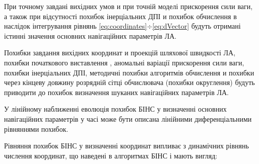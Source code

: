 При точному завдані вихідних умов и при точній  моделі прискорення сили ваги, а також 
при відсутності похибок інерціальних ДПІ и похибок обчислення в наслідок інтегрування 
рівнянь \eqref{eq:coordinates}$\div $\eqref{eq:dVector}  будуть отримані істинні 
значення основних навігаційних параметрів ЛА.

Похибки завдання вихідних координат и проекцій шляхової швидкості ЛА, похибки  початкового 
виставлення , аномальні варіації прискорення сили ваги, похибки інерціальних ДПІ, 
методичні похибки алгоритмів обчислення и похибки через  кінцеву довжину розрядній 
сітці обчислювача (похибки округлення) будуть приводити до похибок визначення шуканих 
навігаційних параметрів ЛА.

У лінійному наближенні еволюція похибок БІНС у визначенні основних навігаційних параметрів 
у часі може бути описана лінійними диференціальними рівняннями похибок.

Рівняння похибок БІНС у визначенні координат випливає з динамічних рівнянь числення 
координат, що наведені в алгоритмах БІНС і мають вигляд:

